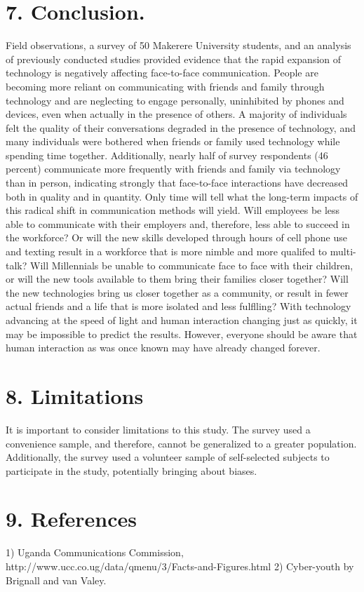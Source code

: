 \documentclass[11pt]{article} %
\begin{document}
\section{7. Conclusion.}
Field observations, a survey of 50 Makerere University students, and an analysis of previously conducted studies provided evidence that the rapid expansion of technology is negatively affecting face-to-face communication. 
People are becoming more reliant on communicating with friends and family through technology and are neglecting to engage personally, uninhibited by phones and devices, even when actually in the presence of others. A majority of individuals felt the quality of their conversations degraded in the presence of technology, and many individuals were bothered when friends or family used technology while spending time together. 
Additionally, nearly half of survey respondents (46 percent) communicate more frequently with friends and family via technology than in person, indicating strongly that face-to-face interactions have decreased both in quality and in quantity.
Only time will tell what the long-term impacts of this radical shift in communication methods will yield. Will employees be less able to communicate with their employers and, therefore, less able to succeed in the workforce? Or will the new skills developed through hours of cell phone use and texting result in a workforce that is more nimble and more qualifed to multi-talk? Will Millennials be unable to communicate face to face with their children, or will the new tools available to them bring their families closer together? Will the new 
technologies bring us closer together as a community, or result in fewer actual friends and a life that is more isolated and less fulflling? With technology advancing at the speed of light and human interaction changing just as quickly, it may be impossible to predict the results. However, everyone should be aware that human interaction as was once known may have already changed forever.

\section{8. Limitations }

It is important to consider limitations to this study. The survey used a convenience sample, and therefore, cannot be generalized to a greater population. Additionally, the survey used a volunteer sample of self-selected subjects to participate in the study, potentially bringing about biases.

\section{9. References }
1) Uganda Communications Commission,
http://www.ucc.co.ug/data/qmenu/3/Facts-and-Figures.html
2) Cyber-youth by Brignall and van Valey.
\end{document}
